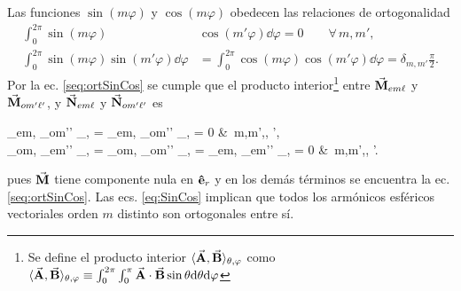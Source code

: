 \documentclass[letterpaper,11pt] {article}
\newcommand{\er}{\ensuremath{\vu{e}_r}}
\begin{document}
 Las funciones $\sin(m\varphi)$ y $\cos(m\varphi)$ obedecen las relaciones de ortogonalidad
 	\begin{subequations}
	\begin{align}
	\int_0^{2\pi} \sin(m\varphi) &\cos(m' \varphi) \dd\varphi = 0 \qquad \forall\, m,m',\label{seq:ortSinCos}\\
	\int_0^{2\pi} \sin(m\varphi) \sin(m'\varphi)\dd\varphi &=  \int_0^{2\pi} \cos(m\varphi) \cos(m'\varphi)\dd\varphi  = \delta_{m,m'}\frac{\pi}{2}.\label{seq:ortCos2}
	\end{align}\label{eq:SinCos}
 	\end{subequations}
Por la ec. \eqref{seq:ortSinCos} se cumple que el producto interior\footnote{Se define el producto interior $\langle \va{A},\va{B} \rangle_{\theta,\varphi}$ como $\langle \va{A},\va{B} \rangle_{\theta,\varphi} \equiv \int_0^{2\pi}\int_0^\pi \va{A}\cdot\va{B} \sin\theta \dd\theta \dd\varphi$} entre $\va{M}_{em\ell}$ y $\va{M}_{om'\ell'}$, y $\va{N}_{em\ell}$ y $\va{N}_{om'\ell'}$ es
	\begin{tcolorbox}
		\langle{}_{em\ell}, _{om'\ell'} \rangle_{\theta,\varphi} =
		\langle{}_{em\ell}, _{om'\ell'} \rangle_{\theta,\varphi} = 0
		&\qquad \forall\,  m,m',\ell, \ell',\\
		\intertext{así como también}
		\langle{}_{om\ell}, _{em'\ell'} \rangle_{\theta,\varphi} = 
		\langle{}_{om\ell}, _{om'\ell'} \rangle_{\theta,\varphi} = 	
		\langle{}_{em\ell}, _{em'\ell'} \rangle_{\theta,\varphi} = 	0
		&\qquad \forall\,  m,m',\ell, \ell'.				
	\end{tcolorbox}\noindent
pues $\va{M}$ tiene componente nula en $\er$ y en los demás términos se encuentra la ec. \eqref{seq:ortSinCos}. Las ecs. \eqref{eq:SinCos} implican que todos los armónicos esféricos vectoriales orden $m$ distinto  son ortogonales entre sí.\\
\end{document}
